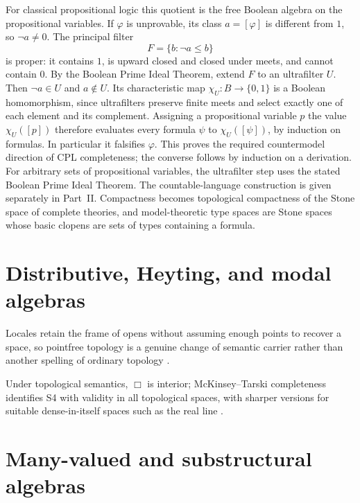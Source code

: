 For classical propositional logic this quotient is the free Boolean algebra on
the propositional variables. If \(\varphi\) is unprovable, its class
\(a=[\varphi]\) is different from \(1\), so \(\neg a\ne0\).
The principal filter
\[
 F=\{b:\neg a\leq b\}
\]
is proper: it contains \(1\), is upward closed and closed under meets,
and cannot contain \(0\).
By the Boolean Prime Ideal Theorem, extend \(F\) to an ultrafilter \(U\).
Then \(\neg a\in U\) and \(a\notin U\).
Its characteristic map \(\chi_U:B\to\{0,1\}\) is a Boolean
homomorphism, since ultrafilters preserve finite meets and select
exactly one of each element and its complement.
Assigning a propositional variable \(p\) the value \(\chi_U([p])\)
therefore evaluates every formula \(\psi\) to \(\chi_U([\psi])\),
by induction on formulas. In particular it falsifies \(\varphi\).
This proves the required countermodel direction of CPL completeness;
the converse follows by induction on a derivation.
For arbitrary sets of propositional variables, the ultrafilter step
uses the stated Boolean Prime Ideal Theorem. The countable-language
construction is given separately in Part~II.
Compactness becomes topological compactness of the Stone space of complete
theories, and model-theoretic type spaces are Stone spaces whose basic clopens
are sets of types containing a formula.

\section{Distributive, Heyting, and modal algebras}
\label{sec:p10-nonclassical-algebras}







Locales retain the frame of opens without assuming enough points to recover a
space, so pointfree topology is a genuine change of semantic carrier rather
than another spelling of ordinary topology \cite{Johnstone1982}.





Under topological semantics, \(\Box\) is interior; McKinsey--Tarski completeness
identifies S4 with validity in all topological spaces, with sharper versions
for suitable dense-in-itself spaces such as the real line
\cite{McKinseyTarski1946}.

\section{Many-valued and substructural algebras}
\label{sec:p10-many-substructural}


